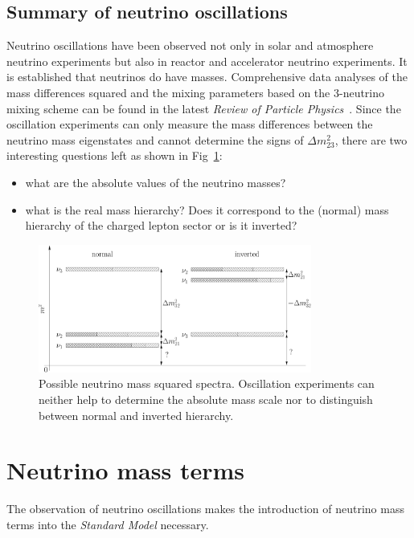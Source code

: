 \subsection{Summary of neutrino oscillations}
\label{sec:allo}
Neutrino oscillations have been observed not only in solar and atmosphere neutrino experiments but also in reactor and accelerator neutrino experiments. It is established that neutrinos do have masses. Comprehensive data analyses of the mass differences squared and the mixing parameters based on the 3-neutrino mixing scheme can be found in the latest \emph{Review of Particle Physics}~\cite{PDG08}. Since the oscillation experiments can only measure the mass differences between the neutrino mass eigenstates and cannot determine the signs of $\Delta m^{2}_{23}$, there are two interesting questions left as shown in Fig~\ref{fig:hie}:
\begin{itemize}
\item what are the absolute values of the neutrino masses?
\item what is the real mass hierarchy? Does it correspond to the   (normal) mass hierarchy of the charged lepton sector or is it   inverted?
\end{itemize}
\begin{figure}[tbhp]
  \centering
  \includegraphics[width=0.8\textwidth]{massHierarchy}  
  \caption{Possible neutrino mass squared spectra. Oscillation     experiments can neither help to determine the absolute mass scale     nor to distinguish between normal and inverted hierarchy.}
  \label{fig:hie}
\end{figure}


\section{Neutrino mass terms}
\label{sec:nema}
The observation of neutrino oscillations makes the introduction of
neutrino mass terms into the \emph{Standard Model} necessary.
